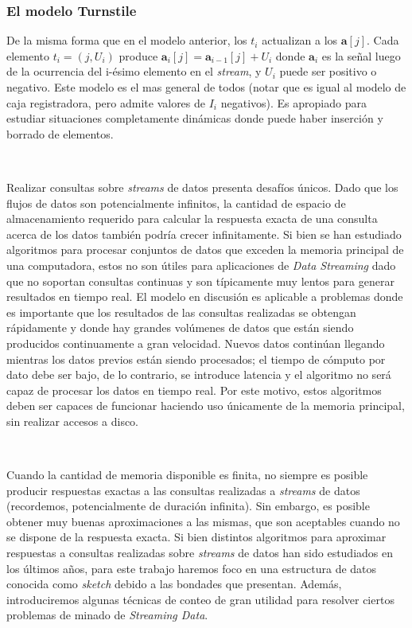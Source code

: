 \documentclass[a4paper,12pt, oneside]{article}
\begin{document}
\subsubsection{El modelo Turnstile}
De la misma forma que en el modelo anterior, los $t_i$ actualizan a los $\textbf{a}[j]$. Cada elemento $t_i = (j, U_i)$ produce  $\textbf{a}_i[j] = \textbf{a}_{i-1} [j] + U_i$ donde $\textbf{a}_i$ es la señal luego de la ocurrencia del i-ésimo elemento en el \textit{stream}, y $U_i$ puede ser positivo o negativo. Este modelo es el mas general de todos (notar que es igual al modelo de caja registradora, pero admite valores de $I_i$ negativos). Es apropiado para estudiar situaciones completamente dinámicas donde puede haber inserción y borrado de elementos. 

\

Realizar consultas sobre \textit{streams} de datos presenta desafíos únicos. Dado que los flujos de datos son potencialmente infinitos, la cantidad de espacio de almacenamiento requerido para calcular la respuesta exacta de una consulta acerca de los datos también podría crecer infinitamente. Si bien se han estudiado algoritmos para procesar conjuntos de datos que exceden la memoria principal de una computadora\cite{Vitter:2001:EMA:384192.384193}, estos no son útiles para aplicaciones de \textit{Data Streaming} dado que no soportan consultas continuas y son típicamente muy lentos para generar resultados en tiempo real. El modelo en discusión es aplicable a problemas donde es importante que los resultados de las consultas realizadas se obtengan rápidamente y donde hay grandes volúmenes de datos que están siendo producidos continuamente a gran velocidad. Nuevos datos continúan llegando mientras los datos previos están siendo procesados; el tiempo de cómputo por dato debe ser bajo, de lo contrario, se introduce latencia y el algoritmo no será capaz de procesar los datos en tiempo real. Por este motivo, estos algoritmos deben ser capaces de funcionar haciendo uso únicamente de la memoria principal, sin realizar accesos a disco.

\

Cuando la cantidad de memoria disponible es finita, no siempre es posible producir respuestas exactas a las consultas realizadas a \textit{streams} de datos (recordemos, potencialmente de duración infinita). Sin embargo, es posible obtener muy buenas aproximaciones a las mismas, que son aceptables cuando no se dispone de la respuesta exacta. Si bien distintos algoritmos para aproximar respuestas a consultas realizadas sobre \textit{streams} de datos han sido estudiados en los últimos años, para este trabajo haremos foco en una estructura de datos conocida como  \textit{sketch}\cite{Alon:1996:SCA:237814.237823}\cite{Flajolet:1985:PCA:5212.5215} debido a las bondades que presentan. Además, introduciremos algunas técnicas de conteo de gran utilidad para resolver ciertos problemas de minado de \textit{Streaming Data}.
\end{document}
